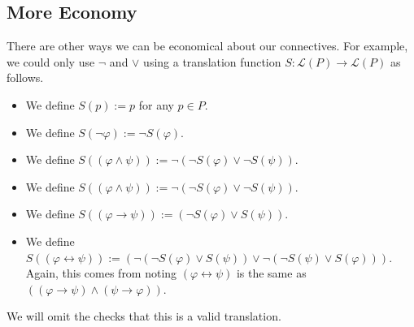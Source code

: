 \documentclass[../notes.tex]{subfiles}
\begin{document}
\subsection{More Economy}
There are other ways we can be economical about our connectives. For example, we could only use $\lnot$ and $\lor$ using a translation function $S:\mathcal L(P)\to\mathcal L(P)$ as follows.
\begin{itemize}
	\item We define $S(p):=p$ for any $p\in P$.
	\item We define $S(\lnot\varphi):=\lnot S(\varphi)$.
	\item We define $S((\varphi\land\psi)):=\lnot(\lnot S(\varphi)\lor\lnot S(\psi))$.
	\item We define $S((\varphi\land\psi)):=\lnot(\lnot S(\varphi)\lor\lnot S(\psi))$.
	\item We define $S((\varphi\to\psi)):=(\lnot S(\varphi)\lor S(\psi))$.
	\item We define $S((\varphi\leftrightarrow\psi)):=(\lnot(\lnot S(\varphi)\lor S(\psi))\lor\lnot(\lnot S(\psi)\lor S(\varphi)))$. Again, this comes from noting $(\varphi\leftrightarrow\psi)$ is the same as $((\varphi\to\psi)\land(\psi\to\varphi))$.
\end{itemize}
We will omit the checks that this is a valid translation.
\end{document}
